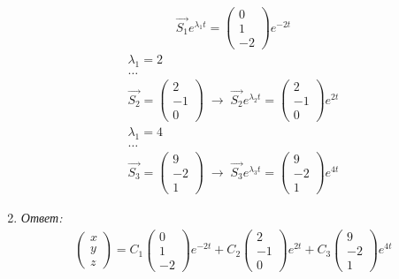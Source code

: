 \documentclass[10pt, a4paper]{article}
\begin{document}
\begin{enumerate}
\begin{gather*}
            \Vec{S_1}e^{\lambda_1 t} = \begin{pmatrix} 0 \\ 1 \\ -2 \end{pmatrix} e^{-2t}
        \end{gather*}
        \begin{gather*}
            \lambda_1 = 2 \\
            \dots \\
            \Vec{S_2} = \begin{pmatrix} 2 \\ -1 \\ 0 \end{pmatrix} \; \rightarrow \;
            \Vec{S_2}e^{\lambda_2 t} = \begin{pmatrix} 2 \\ -1 \\ 0 \end{pmatrix} e^{2t}
        \end{gather*}
        \begin{gather*}
            \lambda_1 = 4 \\
            \dots \\
            \Vec{S_3} = \begin{pmatrix} 9 \\ -2 \\ 1 \end{pmatrix} \; \rightarrow \;
            \Vec{S_3}e^{\lambda_3 t} = \begin{pmatrix} 9 \\ -2 \\ 1 \end{pmatrix} e^{4t}
        \end{gather*}
    \item \textit{Ответ:}
        \begin{gather*}
            \begin{pmatrix} x \\ y \\ z \end{pmatrix} =
            C_1\begin{pmatrix} 0 \\ 1 \\ -2 \end{pmatrix} e^{-2t}
            + C_2\begin{pmatrix} 2 \\ -1 \\ 0 \end{pmatrix} e^{2t}
            + C_3\begin{pmatrix} 9 \\ -2 \\ 1 \end{pmatrix} e^{4t}
        \end{gather*}
\end{enumerate}
\end{document}
